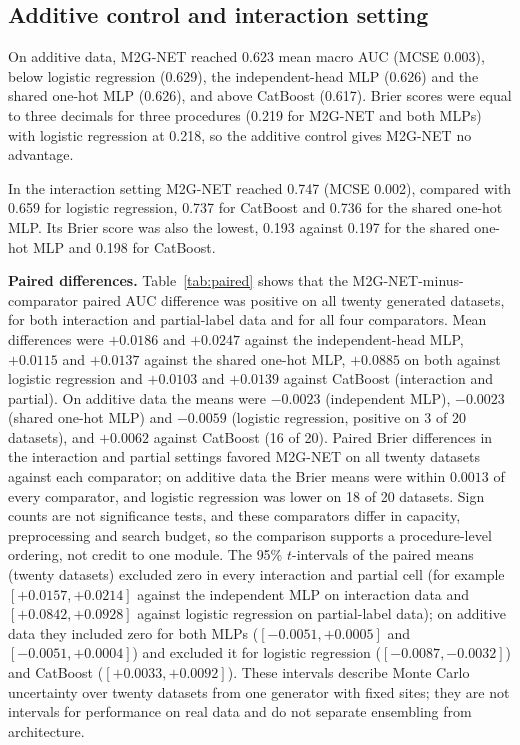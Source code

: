 \documentclass[9pt, conference, a4paper, compsocconf]{IEEEtran}
\begin{document}
\subsection{Additive control and interaction setting}
On additive data, M2G-NET reached 0.623 mean macro AUC (MCSE 0.003), below logistic regression (0.629), the independent-head MLP (0.626) and the shared one-hot MLP (0.626), and above CatBoost (0.617). Brier scores were equal to three decimals for three procedures (0.219 for M2G-NET and both MLPs) with logistic regression at 0.218, so the additive control gives M2G-NET no advantage.

In the interaction setting M2G-NET reached 0.747 (MCSE 0.002), compared with 0.659 for logistic regression, 0.737 for CatBoost and 0.736 for the shared one-hot MLP. Its Brier score was also the lowest, 0.193 against 0.197 for the shared one-hot MLP and 0.198 for CatBoost.

\textbf{Paired differences.} Table~\ref{tab:paired} shows that the M2G-NET-minus-comparator paired AUC difference was positive on all twenty generated datasets, for both interaction and partial-label data and for all four comparators. Mean differences were $+0.0186$ and $+0.0247$ against the independent-head MLP, $+0.0115$ and $+0.0137$ against the shared one-hot MLP, $+0.0885$ on both against logistic regression and $+0.0103$ and $+0.0139$ against CatBoost (interaction and partial). On additive data the means were $-0.0023$ (independent MLP), $-0.0023$ (shared one-hot MLP) and $-0.0059$ (logistic regression, positive on 3 of 20 datasets), and $+0.0062$ against CatBoost (16 of 20). Paired Brier differences in the interaction and partial settings favored M2G-NET on all twenty datasets against each comparator; on additive data the Brier means were within $0.0013$ of every comparator, and logistic regression was lower on 18 of 20 datasets. Sign counts are not significance tests, and these comparators differ in capacity, preprocessing and search budget, so the comparison supports a procedure-level ordering, not credit to one module. The 95\% $t$-intervals of the paired means (twenty datasets) excluded zero in every interaction and partial cell (for example $[+0.0157,+0.0214]$ against the independent MLP on interaction data and $[+0.0842,+0.0928]$ against logistic regression on partial-label data); on additive data they included zero for both MLPs ($[-0.0051,+0.0005]$ and $[-0.0051,+0.0004]$) and excluded it for logistic regression ($[-0.0087,-0.0032]$) and CatBoost ($[+0.0033,+0.0092]$). These intervals describe Monte Carlo uncertainty over twenty datasets from one generator with fixed sites; they are not intervals for performance on real data and do not separate ensembling from architecture.
\end{document}
